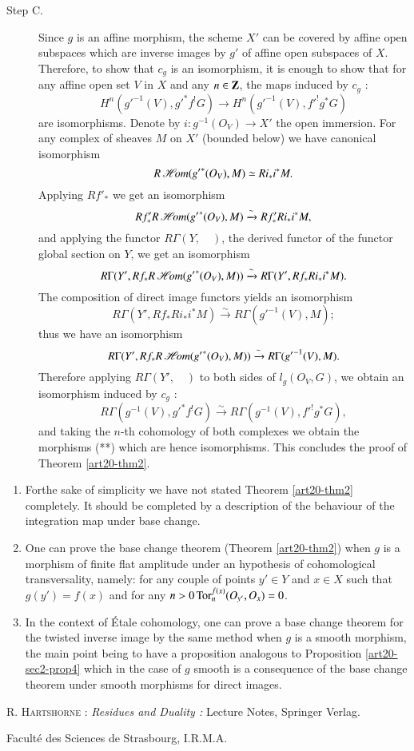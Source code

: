 \begin{description}
\item[Step C.] Since $g$ is an affine morphism, the scheme $X'$ can be covered by affine open subspaces which are inverse images by $g'$ of affine open subspaces of $X$. Therefore, to show that $c_{g}$ is an isomorphism, it is enough to show that for any affine open set $V$ in $X$ and any $n\in \mathbf{Z}$, the maps induced by $c_{g}$ :
\begin{equation*}
H^{n}({g'}^{-1}(V),{g'}^{*}f^{!}G)\to H^{n}({g'}^{-1}(V),{f'}^{!}g^{*}G)\tag{**}
\end{equation*}
are isomorphisms. Denote by $i:g^{-1}(O_{V})\to X'$ the open immersion. For any complex of sheaves $M$ on $X'$ (bounded below) we have canonical isomorphism
$$
R\operatorname{\mathscr{H}\!\textit{om}}({g'}^{*}(O_{V}), M)\simeq Ri_{*}i^{*}M.
$$
Applying $Rf'_{*}$ we get an isomorphism
$$
Rf'_{*}R\operatorname{\mathscr{H}\!\textit{om}}({g'}^{*}(O_{V}),M)\xrightarrow{\sim} Rf'_{*}Ri_{*}i^{*}M,
$$
and applying the functor $R\Gamma(Y,\quad)$, the derived functor of the functor global section on $Y$, we get an isomorphism
$$
R\Gamma(Y',Rf_{*}R\operatorname{\mathscr{H}\!\textit{om}}({g'}^{*}(O_{V}),M))\xrightarrow{\sim}R\Gamma(Y',Rf_{*}Ri_{*}i^{*}M).
$$
The composition of direct image functors yields an isomorphism
$$
R\Gamma(Y',Rf_{*}Ri_{*}i^{*}M)\xrightarrow{\sim}R\Gamma({g'}^{-1}(V),M);
$$
thus we have an isomorphism
$$
R\Gamma(Y',Rf_{*}R\operatorname{\mathscr{H}\!\textit{om}}({g'}^{*}(O_{V}),M))\xrightarrow{\sim}R\Gamma({g'}^{-1}(V),M).
$$
Therefore applying $R\Gamma(Y',\quad)$ to both sides of $l_{g}(O_{V},G)$, we obtain an isomorphism induced by $c_{g}$ :
$$
R\Gamma(g^{-1}(V),{g'}^{*}f^{!}G)\xrightarrow{\sim}R\Gamma(g^{-1}(V),{f'}^{!}g^{*}G),
$$
and taking the $n$-th cohomology of both complexes we obtain the morphisms (**) which are hence isomorphisms. This concludes the proof of Theorem \ref{art20-thm2}.
\end{description}

\begin{remark*}
\begin{enumerate}
\renewcommand{\labelenumi}{(\theenumi)}
\item For\pageoriginale the sake of simplicity we have not stated Theorem \ref{art20-thm2} completely. It should be completed by a description of the behaviour of the integration map under base change.

\item One can prove the base change theorem (Theorem \ref{art20-thm2}) when $g$ is a morphism of finite flat amplitude under an hypothesis of cohomological transversality, namely: for any couple of points $y'\in Y$ and $x\in X$ such that $g(y')=f(x)$ and for any $n>0\operatorname{\mathrm{Tor}}^{f(x)}_{n}(O_{y'},O_{x})=0$.

\item In the context of \'Etale cohomology, one can prove a base change theorem for the twisted inverse image by the same method when $g$ is a smooth morphism, the main point being to have a proposition analogous to Proposition \ref{art20-sec2-prop4} which in the case of $g$ smooth is a consequence of the base change theorem under smooth morphisms for direct images.
\end{enumerate}
\end{remark*}

\begin{thebibliography}{99}
 \textsc{R. Hartshorne :} {\em Residues and Duality :} Lecture Notes, Springer Verlag. 
\end{thebibliography}

\bigskip
\noindent
{\small Facult\'e des Sciences de Strasbourg, I.R.M.A.}
